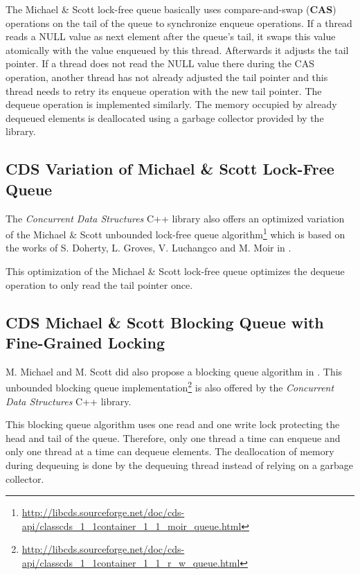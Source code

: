 	The Michael \& Scott lock-free queue basically uses compare-and-swap (\textbf{CAS}) operations on the tail of the queue to synchronize enqueue operations. If a thread reads a NULL value as next element after the queue's tail, it swaps this value atomically with the value enqueued by this thread. Afterwards it adjusts the tail pointer. If a thread does not read the NULL value there during the CAS operation, another thread has not already adjusted the tail pointer and this thread needs to retry its enqueue operation with the new tail pointer. The dequeue operation is implemented similarly. The memory occupied by already dequeued elements is deallocated using a garbage collector provided by the library.

\subsection[CDS MoirQueue]{CDS Variation of Michael \& Scott Lock-Free Queue} \label{subsec:cds-moir}

	The \textit{Concurrent Data Structures} C++ library also offers an optimized variation of the Michael \& Scott unbounded lock-free queue algorithm\footnote{\url{http://libcds.sourceforge.net/doc/cds-api/classcds\_1\_1container\_1\_1\_moir\_queue.html}} which is based on the works of S. Doherty, L. Groves, V. Luchangco and M. Moir in \cite{Doherty:2004}.
	
	This optimization of the Michael \& Scott lock-free queue optimizes the dequeue operation to only read the tail pointer once.

\subsection[CDS RWQueue]{CDS Michael \& Scott Blocking Queue with Fine-Grained Locking} \label{subsec:cds-rw}

	M. Michael and M. Scott did also propose a blocking queue algorithm in \cite{Michael:1996}. This unbounded blocking queue implementation\footnote{\url{http://libcds.sourceforge.net/doc/cds-api/classcds\_1\_1container\_1\_1\_r\_w\_queue.html}} is also offered by the \textit{Concurrent Data Structures} C++ library.
	
	This blocking queue algorithm uses one read and one write lock protecting the head and tail of the queue. Therefore, only one thread a time can enqueue and only one thread at a time can dequeue elements. The deallocation of memory during dequeuing is done by the dequeuing thread instead of relying on a garbage collector.

